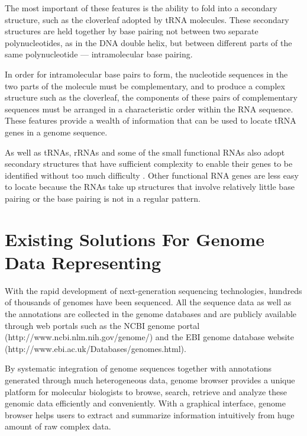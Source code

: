 The most important of these features is the ability to fold into a secondary structure, such as the cloverleaf adopted by tRNA molecules. 
These secondary structures are held together by base pairing not between two separate polynucleotides, as in the DNA double helix, 
but between different parts of the same polynucleotide — intramolecular base pairing. 

In order for intramolecular base pairs to form, the nucleotide sequences in the two parts of the molecule must be complementary, 
and to produce a complex structure such as the cloverleaf, the components of these pairs of complementary sequences must be arranged in a characteristic order within the RNA sequence. 
These features provide a wealth of information that can be used to locate tRNA genes in a genome sequence.

As well as tRNAs, rRNAs and some of the small functional RNAs also adopt secondary structures that have sufficient complexity to enable their genes to be identified without too much difficulty \cite{rna}. 
Other functional RNA genes are less easy to locate because the RNAs take up structures that involve relatively little base pairing or the base pairing is not in a regular pattern.

\section{Existing Solutions For Genome Data Representing}
With the rapid development of next-generation sequencing technologies, hundreds of thousands of genomes have been sequenced. %
All the sequence data as well as the annotations are collected in the genome databases and are publicly available 
through web portals such as the NCBI genome portal (http://www.ncbi.nlm.nih.gov/genome/) and the EBI genome database website (http://www.ebi.ac.uk/Databases/genomes.html). 

By systematic integration of genome sequences together with annotations generated through much heterogeneous data, genome browser provides a unique platform 
for molecular biologists to browse, search, retrieve and analyze these genomic data efficiently and conveniently. 
With a graphical interface, genome browser helps users to extract and summarize information intuitively from huge amount of raw complex data. 

